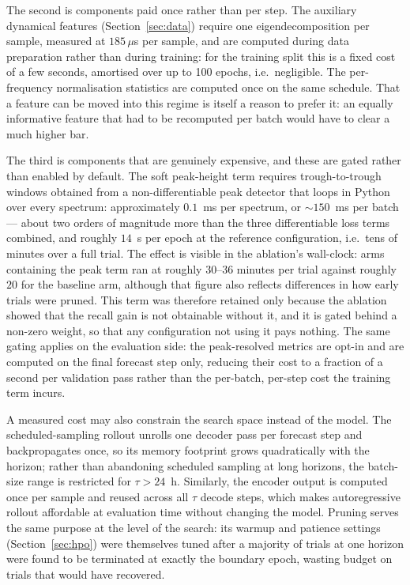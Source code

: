 The second is components paid once rather than per step. The auxiliary dynamical features (Section~\ref{sec:data}) require one eigendecomposition per sample, measured at $185\,\mu$s per sample, and are computed during data preparation rather than during training: for the training split this is a fixed cost of a few seconds, amortised over up to 100 epochs, i.e.\ negligible. The per-frequency normalisation statistics are computed once on the same schedule. That a feature can be moved into this regime is itself a reason to prefer it: an equally informative feature that had to be recomputed per batch would have to clear a much higher bar.

The third is components that are genuinely expensive, and these are gated rather than enabled by default. The soft peak-height term requires trough-to-trough windows obtained from a non-differentiable peak detector that loops in Python over every spectrum: approximately $0.1$~ms per spectrum, or $\sim$$150$~ms per batch — about two orders of magnitude more than the three differentiable loss terms combined, and roughly $14$~s per epoch at the reference configuration, i.e.\ tens of minutes over a full trial. The effect is visible in the ablation's wall-clock: arms containing the peak term ran at roughly $30$--$36$ minutes per trial against roughly $20$ for the baseline arm, although that figure also reflects differences in how early trials were pruned. This term was therefore retained only because the ablation showed that the recall gain is not obtainable without it, and it is gated behind a non-zero weight, so that any configuration not using it pays nothing. The same gating applies on the evaluation side: the peak-resolved metrics are opt-in and are computed on the final forecast step only, reducing their cost to a fraction of a second per validation pass rather than the per-batch, per-step cost the training term incurs.

A measured cost may also constrain the search space instead of the model. The scheduled-sampling rollout unrolls one decoder pass per forecast step and backpropagates once, so its memory footprint grows quadratically with the horizon; rather than abandoning scheduled sampling at long horizons, the batch-size range is restricted for $\tau > 24$~h. Similarly, the encoder output is computed once per sample and reused across all $\tau$ decode steps, which makes autoregressive rollout affordable at evaluation time without changing the model. Pruning serves the same purpose at the level of the search: its warmup and patience settings (Section~\ref{sec:hpo}) were themselves tuned after a majority of trials at one horizon were found to be terminated at exactly the boundary epoch, wasting budget on trials that would have recovered.

